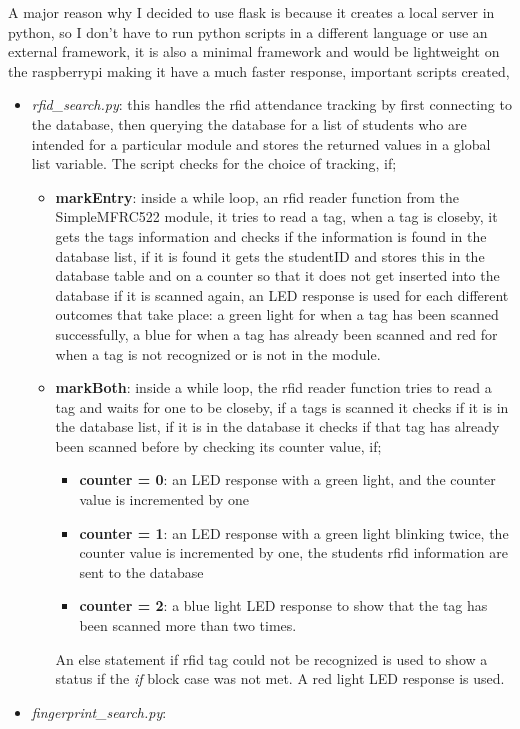 A major reason why I decided to use flask is because it creates a local server in python, so I don't have to run python scripts in a different language or use an external framework, it is also a minimal framework and would be lightweight on the raspberrypi making it have a much faster response, important scripts created, 
\begin{itemize}
  \item \textit{rfid\_search.py}: this handles the rfid attendance tracking by first connecting to the database, then querying the database for a list of students who are intended for a particular module and stores the returned values in a global list variable. The script checks for the choice of tracking, if;
  \begin{itemize}
    \item \textbf{markEntry}: inside a while loop, an rfid reader function from the SimpleMFRC522 module, it tries to read a tag, when a tag is closeby, it gets the tags information and checks if the information is found in the database list, if it is found it gets the studentID and stores this in the database table and on a counter so that it does not get inserted into the database if it is scanned again, an LED response is used for each different outcomes that take place: a green light for when a tag has been scanned successfully, a blue for when a tag has already been scanned and red for when a tag is not recognized or is not in the module.
    \item \textbf{markBoth}: inside a while loop, the rfid reader function tries to read a tag and waits for one to be closeby, if a tags is scanned it checks if it is in the database list, if it is in the database it checks if that tag has already been scanned before by checking its counter value, if;
    \begin{itemize}
      \item \textbf{counter = 0}: an LED response with a green light, and the counter value is incremented by one
      \item \textbf{counter = 1}: an LED response with a green light blinking twice, the counter value is incremented by one, the students rfid information are sent to the database
      \item \textbf{counter = 2}: a blue light LED response to show that the tag has been scanned more than two times.
    \end{itemize}
    An else statement if rfid tag could not be recognized is used to show a status if the \textit{if} block case was not met. A red light LED response is used. 
  \end{itemize}
  \item \textit{fingerprint\_search.py}: 
\end{itemize}



